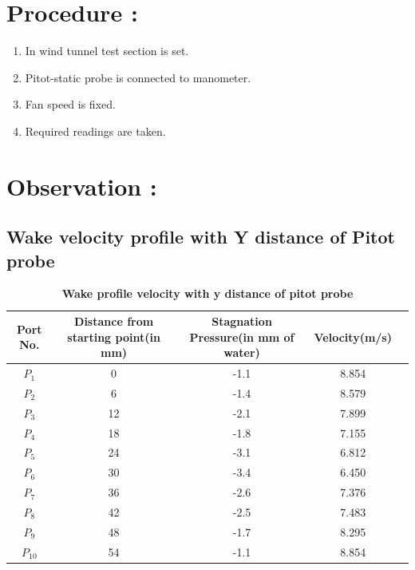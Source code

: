 \documentclass[12pt,a4paper]{article}
\begin{document}
\section{Procedure :}
\begin{enumerate}
    \item In wind tunnel test section is set.
    \item Pitot-static probe is connected to manometer.
    \item Fan speed is fixed.
    \item Required readings are taken.
\end{enumerate}






\section{Observation :}


\subsection{Wake velocity profile with Y distance of Pitot  probe  }
\begin{table}[ht]
\centering
\caption{\textbf{Wake profile velocity with y distance of pitot probe}}
\vspace{2mm}
\begin{flushleft}
\begin{tabular}{|c|c|c|c|c|} 
 \hline
Port No. & Distance from starting point(in mm) & Stagnation Pressure(in mm of water) & Velocity(m/s) \\ [0.1ex] 
 \hline
$P_1$ & 0 & -1.1  & 8.854 \\ 
 \hline
$P_2$ & 6 & -1.4 & 8.579  \\
 \hline
$P_3$ & 12 & -2.1 & 7.899  \\
 \hline
 $P_4$ & 18 & -1.8 & 7.155  \\
 \hline
$P_5$ & 24 & -3.1 & 6.812  \\
 \hline
$P_6$ & 30 & -3.4 & 6.450 \\ 
 \hline
$P_7$ & 36 & -2.6 & 7.376 \\ 
 \hline
$P_8$ & 42 & -2.5 & 7.483\\
 \hline
$P_9$ & 48 & -1.7 & 8.295\\
 \hline
$P_{10}$ & 54 & -1.1 & 8.854\\ 
 \hline 

\end{tabular}
\end{flushleft}
\end{table}
\end{document}
